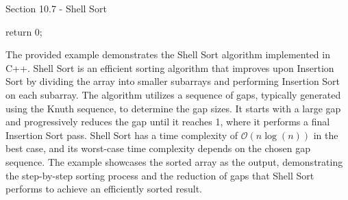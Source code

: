 \begin{notes}{Section 10.7 - Shell Sort}
\begin{highlight}
\begin{code}[C++]
{        return 0;
    }
    \end{code}
        The provided example demonstrates the Shell Sort algorithm implemented in C++. Shell Sort is an efficient sorting algorithm that improves upon Insertion Sort by dividing the array into smaller subarrays and performing Insertion Sort on each subarray. The algorithm utilizes a sequence of gaps, typically generated using the Knuth sequence,
        to determine the gap sizes. It starts with a large gap and progressively reduces the gap until it reaches 1, where it performs a final Insertion Sort pass. Shell Sort has a time complexity of $\mathcal{O}(n\log{(n)})$ in the best case, and its worst-case time complexity depends on the chosen gap sequence. The example showcases the sorted
        array as the output, demonstrating the step-by-step sorting process and the reduction of gaps that Shell Sort performs to achieve an efficiently sorted result.
    \end{highlight}
\end{notes}

